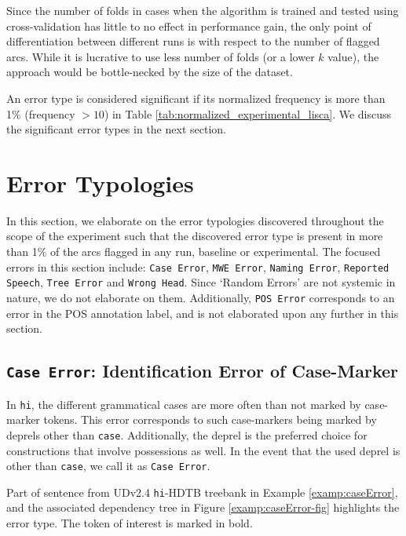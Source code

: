 Since the number of folds in cases when the algorithm is trained and tested using cross-validation has little to no effect in performance gain, the only point of differentiation between different runs is with respect to the number of flagged arcs. While it is lucrative to use less number of folds (or a lower \(k\) value), the approach would be bottle-necked by the size of the dataset.

An error type is considered significant if its normalized frequency is more than 1\% (frequency \(> 10\)) in  Table \ref{tab:normalized_experimental_lisca}. We discuss the significant error types in the next section.

\section{Error Typologies}
\label{typologies:lisca}

In this section, we elaborate on the error typologies discovered throughout the scope of the experiment such that the discovered error type is present in more than 1\% of the arcs flagged in any run, baseline or experimental. The focused errors in this section include: \texttt{Case Error}, \texttt{MWE Error}, \texttt{Naming Error}, \texttt{Reported Speech}, \texttt{Tree Error} and \texttt{Wrong Head}. Since `Random Errors' are not systemic in nature, we do not elaborate on them. Additionally, \texttt{POS Error} corresponds to an error in the POS annotation label, and is not elaborated upon any further in this section.

\subsection[Identification Error of Case-Marker: \texttt{Case Error}]{\texttt{Case Error}: Identification Error of Case-Marker}

In \texttt{hi}, the different grammatical cases are more often than not marked by case-marker tokens. This error corresponds to such case-markers being marked by deprels other than \texttt{case}. Additionally, the deprel is the preferred choice for constructions that involve possessions as well. In the event that the used deprel is other than \texttt{case}, we call it as \texttt{Case Error}.

Part of sentence from UDv2.4 \texttt{hi}-HDTB treebank in Example \ref{examp:caseError}, and the associated dependency tree in Figure \ref{examp:caseError-fig} highlights the error type. The token of interest is marked in bold.

